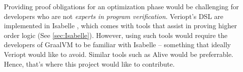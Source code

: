 Providing proof obligations for an optimization phase would be challenging for developers who are not \emph{experts in program verification}. Veriopt's 
DSL are implemented in Isabelle \cite{IsabelleHOL}, which comes with tools that assist in proving higher order logic (See \ref{sec:Isabelle}). 
However, using such tools would require the developers of GraalVM to be familiar with Isabelle -- something that ideally Veriopt would like to avoid. 
Similar tools such as Alive \cite{AliveInLean} would be preferrable. Hence, that's where this project would like to contribute.